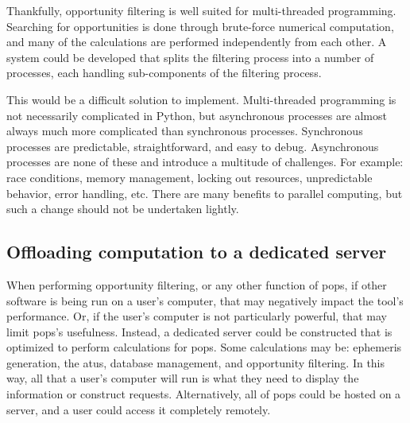 Thankfully, opportunity filtering is well suited for multi-threaded
programming. Searching for opportunities is done through brute-force numerical
computation, and many of the calculations are performed independently from each
other. A system could be developed that splits the filtering process into a
number of processes, each handling sub-components of the filtering process. 

This would be a difficult solution to implement. Multi-threaded programming is
not necessarily complicated in Python, but asynchronous processes are almost
always much more complicated than synchronous processes. Synchronous processes
are predictable, straightforward, and easy to debug. Asynchronous processes are
none of these and introduce a multitude of challenges. For example: race
conditions, memory management, locking out resources, unpredictable behavior,
error handling, etc.  There are many benefits to parallel computing, but such a
change should not be undertaken lightly.


\subsection{Offloading computation to a dedicated server}

When performing opportunity filtering, or any other function of \gls{pops}, if
other software is being run on a user's computer, that may negatively impact
the tool's performance. Or, if the user's computer is not particularly
powerful, that may limit \gls{pops}'s usefulness. Instead, a dedicated server
could be constructed that is optimized to perform calculations for \gls{pops}.
Some calculations may be: ephemeris generation, the \glspl{atu}, database
management, and opportunity filtering. In this way, all that a user's computer
will run is what they need to display the information or construct requests.
Alternatively, all of \gls{pops} could be hosted on a server, and a user could
access it completely remotely. 

